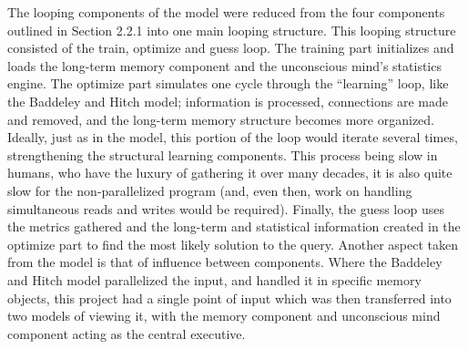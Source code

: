 The looping components of the model were reduced from the four
components outlined in Section 2.2.1 into one main looping structure.  This looping structure
consisted of the train, optimize and guess loop.  The training part initializes
and loads the long-term memory component and the unconscious mind's statistics
engine.  The optimize part simulates one cycle through the ``learning'' loop,
like the Baddeley and Hitch model; information is processed, connections are
made and removed, and the long-term memory structure becomes more organized.
Ideally, just as in the model, this portion of the loop would iterate several
times, strengthening the structural learning components. This process being slow
in humans, who have the luxury of gathering it over many decades, it is also quite
slow for the non-parallelized program (and, even then, work on handling
simultaneous reads and writes would be required). Finally, the guess loop uses the
metrics gathered and the long-term and statistical information created in the
optimize part to find the most likely solution to the query. Another aspect
taken from the model is that of influence between components.  Where the
Baddeley and Hitch model parallelized the input, and handled it in specific
memory objects, this project had a single point of input which was then
transferred into two models of viewing it, with the memory component and
unconscious mind component acting as the central executive.

